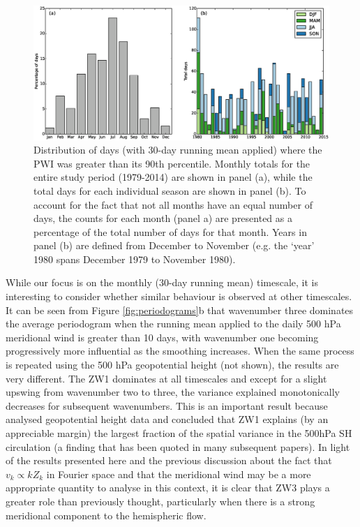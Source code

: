 \begin{figure}
\begin{center}
\includegraphics[width=1\columnwidth]{figures/zonalwaves/dates-summary_pwigt90pct_ERAInterim_500hPa_030day-runmean_native.eps}
\caption{\label{fig:annual_distribution}
Distribution of days (with 30-day running mean applied) where the PWI was greater than its 90th percentile. Monthly totals for the entire study period (1979-2014) are shown in panel (a), while the total days for each individual season are shown in panel (b). To account for the fact that not all months have an equal number of days, the counts for each month (panel a) are presented as a percentage of the total number of days for that month. Years in panel (b) are defined from December to November (e.g. the `year' 1980 spans December 1979 to November 1980).}
\end{center}
\end{figure}

While our focus is on the monthly (30-day running mean) timescale, it is interesting to consider whether similar behaviour is observed at other timescales. It can be seen from Figure \ref{fig:periodograms}b that wavenumber three dominates the average periodogram when the running mean applied to the daily 500 hPa meridional wind is greater than 10 days, with wavenumber one becoming progressively more influential as the smoothing increases. When the same process is repeated using the 500 hPa geopotential height (not shown), the results are very different. The ZW1 dominates at all timescales and except for a slight upswing from wavenumber two to three, the variance explained monotonically decreases for subsequent wavenumbers. This is an important result because \citet{vanLoon1972} analysed geopotential height data and concluded that ZW1 explains (by an appreciable margin) the largest fraction of the spatial variance in the 500hPa SH circulation (a finding that has been quoted in many subsequent papers). In light of the results presented here and the previous discussion about the fact that $v_k \propto k Z_k$ in Fourier space and that the meridional wind may be a more appropriate quantity to analyse in this context, it is clear that ZW3 plays a greater role than previously thought, particularly when there is a strong meridional component to the hemispheric flow. 

